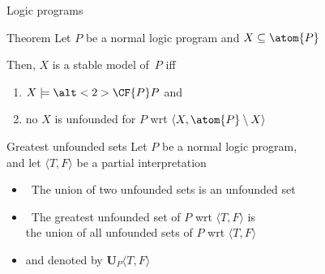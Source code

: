 \begin{frame}{Logic programs}
  \bigskip
  \begin{center}
    \begin{minipage}[t]{0.92\linewidth}
      \begin{block}{ Theorem}
        Let $P$ be a normal logic program and $X\subseteq\atom{P}$
        \par\medskip
        Then, $X$ is a stable model of~$P$ iff
        \smallskip
        \begin{enumerate}
        \item $X\models\alt<2>{\CF{P}}{P}$ and
        \item no  $X$ is unfounded for $P$ wrt $\langle X,\atom{P}\setminus X \rangle$
        \end{enumerate}
      \end{block}
    \end{minipage}
  \end{center}
  \nocite{saczan90a,lee05a}
\end{frame}
\begin{frame}{Greatest unfounded sets}{\phantom{Alternative definition}}\label{unf:greatest}
  Let $P$ be a normal logic program,\\ and let
  $\langle T,F \rangle$ be a partial interpretation
  \medskip
  \begin{itemize}
  \item<2->  \ The union of two unfounded sets is an unfounded set
    \medskip
  \item<3->   \ The \alert{greatest unfounded set} of $P$ wrt $\langle T,F \rangle$ is
    \\ the union of all unfounded sets of $P$ wrt $\langle T,F \rangle$
  \item<4-> [] and denoted by $\mathbf{U}_P\langle T,F \rangle$
  \end{itemize}
\end{frame}
